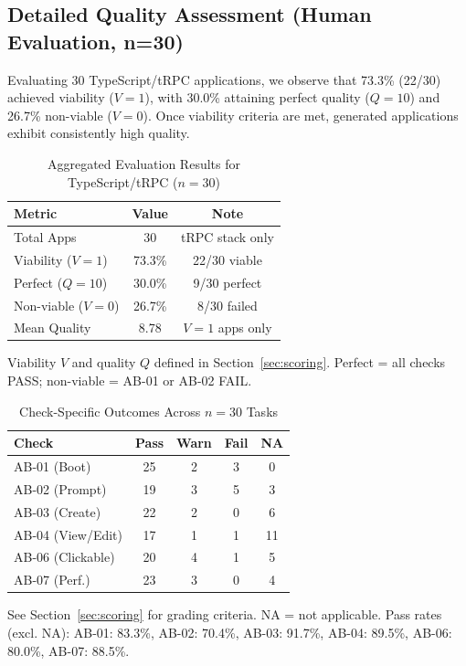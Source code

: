 \documentclass[conference]{IEEEtran}
\begin{document}
\subsection{Detailed Quality Assessment (Human Evaluation, n=30)}

Evaluating 30 TypeScript/tRPC applications, we observe that 73.3\% (22/30) achieved viability ($V=1$), with 30.0\% attaining perfect quality ($Q=10$) and 26.7\% non-viable ($V=0$). Once viability criteria are met, generated applications exhibit consistently high quality.

\begin{table}[!t]
\caption{Aggregated Evaluation Results for TypeScript/tRPC ($n=30$)}
\label{tab:aggregated-results}
\centering
\small
\begin{threeparttable}
\begin{tabular}{@{}lcc@{}}
\toprule
\textbf{Metric} & \textbf{Value} & \textbf{Note} \\
\midrule
Total Apps & 30 & tRPC stack only \\
Viability ($V=1$) & 73.3\% & 22/30 viable \\
Perfect ($Q=10$) & 30.0\% & 9/30 perfect \\
Non-viable ($V=0$) & 26.7\% & 8/30 failed \\
Mean Quality & 8.78 & $V=1$ apps only \\
\bottomrule
\end{tabular}
\begin{tablenotes}\footnotesize
\item Viability $V$ and quality $Q$ defined in Section~\ref{sec:scoring}. Perfect = all checks PASS; non-viable = AB-01 or AB-02 FAIL.
\end{tablenotes}
\end{threeparttable}
\end{table}

\begin{table}[!t]
\caption{Check-Specific Outcomes Across $n=30$ Tasks}
\label{tab:check-pass-rates}
\centering
\small
\begin{threeparttable}
\begin{tabular}{@{}lcccc@{}}
\toprule
\textbf{Check} & \textbf{Pass} & \textbf{Warn} & \textbf{Fail} & \textbf{NA} \\
\midrule
AB-01 (Boot) & 25 & 2 & 3 & 0 \\
AB-02 (Prompt) & 19 & 3 & 5 & 3 \\
AB-03 (Create) & 22 & 2 & 0 & 6 \\
AB-04 (View/Edit) & 17 & 1 & 1 & 11 \\
AB-06 (Clickable) & 20 & 4 & 1 & 5 \\
AB-07 (Perf.) & 23 & 3 & 0 & 4 \\
\bottomrule
\end{tabular}
\begin{tablenotes}\footnotesize
\item See Section~\ref{sec:scoring} for grading criteria. NA = not applicable. Pass rates (excl. NA): AB-01: 83.3\%, AB-02: 70.4\%, AB-03: 91.7\%, AB-04: 89.5\%, AB-06: 80.0\%, AB-07: 88.5\%.
\end{tablenotes}
\end{threeparttable}
\end{table}
\end{document}
